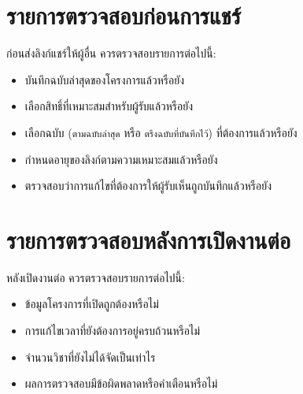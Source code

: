 \section{รายการตรวจสอบก่อนการแชร์}

ก่อนส่งลิงก์แชร์ให้ผู้อื่น ควรตรวจสอบรายการต่อไปนี้:

\begin{itemize}
  \item บันทึกฉบับล่าสุดของโครงการแล้วหรือยัง
  \item เลือกสิทธิ์ที่เหมาะสมสำหรับผู้รับแล้วหรือยัง
  \item เลือกฉบับ (\texttt{ตามฉบับล่าสุด} หรือ \texttt{ตรึงฉบับที่บันทึกไว้})
        ที่ต้องการแล้วหรือยัง
  \item กำหนดอายุของลิงก์ตามความเหมาะสมแล้วหรือยัง
  \item ตรวจสอบว่าการแก้ไขที่ต้องการให้ผู้รับเห็นถูกบันทึกแล้วหรือยัง
\end{itemize}

\section{รายการตรวจสอบหลังการเปิดงานต่อ}

หลังเปิดงานต่อ ควรตรวจสอบรายการต่อไปนี้:

\begin{itemize}
  \item ข้อมูลโครงการที่เปิดถูกต้องหรือไม่
  \item การแก้ไขเวลาที่ยังต้องการอยู่ครบถ้วนหรือไม่
  \item จำนวนวิชาที่ยังไม่ได้จัดเป็นเท่าไร
  \item ผลการตรวจสอบมีข้อผิดพลาดหรือคำเตือนหรือไม่
\end{itemize}

